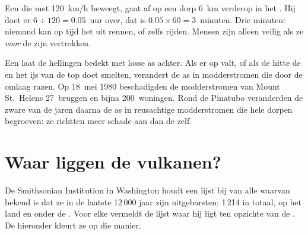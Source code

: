 \begin{example}\label{ex:g7:volcanoes:race}
Een  die met \qty{120}{km/h} beweegt, gaat af op een
dorp \qty{6}{km} verderop in het . Hij doet er $6 \div 120 = 0.05$~uur
over, dat is $0.05 \times 60 = 3$~minuten. Drie minuten: niemand kan op tijd
het  uit rennen, of zelfs rijden. Mensen zijn alleen veilig als ze
\emph{voor} de  zijn vertrokken.
\end{example}

\begin{remark}\label{rem:g7:volcanoes:mudflows}
Een  laat de hellingen bedekt met losse as achter. Als er 
op valt, of als de hitte de  en het ijs van de top doet smelten,
verandert de as in modderstromen die door de  omlaag razen. Op
18~mei 1980 beschadigden de modderstromen van Mount St.~Helens 27~bruggen
en bijna 200~woningen. Rond de Pinatubo veranderden de zware  van de
jaren daarna de as in reusachtige modderstromen die hele dorpen begroeven:
ze richtten meer schade aan dan de  zelf.
\end{remark}


\section{Waar liggen de vulkanen?}

De Smithsonian Institution in Washington houdt een lijst bij van alle
 waarvan bekend is dat ze in de laatste 12\,000 jaar zijn
uitgebarsten: 1\,214 in totaal, op het land en onder de . Voor elke
 vermeldt de lijst waar hij ligt ten opzichte van de . De 
hieronder kleurt ze op die manier.

